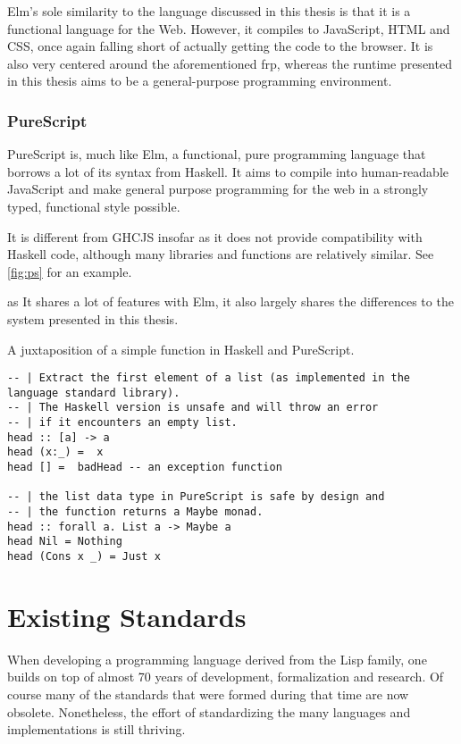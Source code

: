 \documentclass[oneside,11pt,xetex]{scrbook}
\begin{document}
Elm's sole similarity to the language discussed in this thesis is that it is
a functional language for the Web. However, it compiles to JavaScript, HTML
and CSS, once again falling short of actually getting the code to the
browser. It is also very centered around the aforementioned \gls{frp},
whereas the runtime presented in this thesis aims to be a general-purpose
programming environment.

\subsubsection{PureScript}

PureScript is, much like Elm, a functional, pure programming language
that borrows a lot of its syntax from Haskell. It aims to compile into
human-readable JavaScript and make general purpose programming for the web
in a strongly typed, functional style possible.

It is different from GHCJS insofar as it does not provide compatibility
with Haskell code, although many libraries and functions are relatively
similar. See \ref{fig:ps} for an example.

as It shares a lot of features with Elm, it also largely shares the
differences to the system presented in this thesis.

\begin{listing}[H]
\caption{A juxtaposition of a simple function in Haskell and PureScript.}
\begin{verbatim}
-- | Extract the first element of a list (as implemented in the language standard library).
-- | The Haskell version is unsafe and will throw an error
-- | if it encounters an empty list.
head :: [a] -> a
head (x:_) =  x
head [] =  badHead -- an exception function

-- | the list data type in PureScript is safe by design and
-- | the function returns a Maybe monad.
head :: forall a. List a -> Maybe a
head Nil = Nothing
head (Cons x _) = Just x
\end{verbatim}
\end{listing}
\label{fig:ps}

\section{Existing Standards}
\label{sec:ExistingStandards}

When developing a programming language derived from the Lisp family, one builds on
top of almost 70 years of development, formalization and research. Of course
many of the standards that were formed during that time are now obsolete.
Nonetheless, the effort of standardizing the many languages and implementations
is still thriving.
\end{document}
